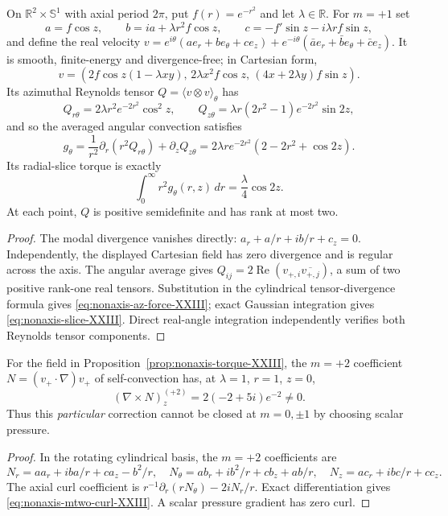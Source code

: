 \begin{proposition}
\label{prop:nonaxis-torque-XXIII}
On $\mathbb R^2\times\mathbb S^1$ with axial period $2\pi$,
put $f(r)=e^{-r^2}$ and let $\lambda\in\mathbb R$.
For $m=+1$ set
\[
a=f\cos z,\qquad b=ia+\lambda r^2f\cos z,\qquad
c=-f'\sin z-i\lambda rf\sin z,
\]
and define the real velocity
$v=e^{i\theta}(a e_r+b e_\theta+c e_z)
+e^{-i\theta}(\bar a e_r+\bar b e_\theta+\bar c e_z)$.
It is smooth, finite-energy and divergence-free; in Cartesian form,
\[
v=(2f\cos z(1-\lambda xy),\,2\lambda x^2f\cos z,\,
       (4x+2\lambda y)f\sin z).
\]
Its azimuthal Reynolds tensor $Q=\langle v\otimes v\rangle_\theta$
has
\[
Q_{r\theta}=2\lambda r^2e^{-2r^2}\cos^2z,\qquad
Q_{z\theta}=\lambda r(2r^2-1)e^{-2r^2}\sin2z,
\]
and so the averaged angular convection satisfies
\begin{equation}\label{eq:nonaxis-az-force-XXIII}
g_\theta=\frac1{r^2}\partial_r(r^2Q_{r\theta})
             +\partial_zQ_{z\theta}
=2\lambda r e^{-2r^2}(2-2r^2+\cos2z).
\end{equation}
Its radial-slice torque is exactly
\begin{equation}\label{eq:nonaxis-slice-XXIII}
\int_0^\infty r^2g_\theta(r,z)\,dr
=\frac{\lambda}{4}\cos2z.
\end{equation}
At each point, $Q$ is positive semidefinite and has rank at most
two.
\end{proposition}
\begin{proof}
The modal divergence vanishes directly:
$a_r+a/r+ib/r+c_z=0$. Independently, the displayed Cartesian
field has zero divergence and is regular across the axis.
The angular average gives
$Q_{ij}=2\operatorname{Re}(v_{+,i}\overline{v_{+,j}})$,
a sum of two positive rank-one real tensors.
Substitution in the cylindrical tensor-divergence formula gives
\eqref{eq:nonaxis-az-force-XXIII}; exact Gaussian integration gives
\eqref{eq:nonaxis-slice-XXIII}. Direct real-angle integration
independently verifies both Reynolds tensor components.
\end{proof}

\begin{proposition}
\label{prop:nonaxis-mtwo-XXIII}
For the field in Proposition~\ref{prop:nonaxis-torque-XXIII}, the
$m=+2$ coefficient $N=(v_+\cdot\nabla)v_+$ of self-convection
has, at $\lambda=1$, $r=1$, $z=0$,
\begin{equation}\label{eq:nonaxis-mtwo-curl-XXIII}
(\nabla\times N)^{(+2)}_z=2(-2+5i)e^{-2}\ne0.
\end{equation}
Thus this \emph{particular} correction cannot be closed at
$m=0,\pm1$ by choosing scalar pressure.
\end{proposition}
\begin{proof}
In the rotating cylindrical basis, the $m=+2$ coefficients are
\[
N_r=aa_r+iba/r+ca_z-b^2/r,\quad
N_\theta=ab_r+ib^2/r+cb_z+ab/r,\quad
N_z=ac_r+ibc/r+cc_z.
\]
The axial curl coefficient is
$r^{-1}\partial_r(rN_\theta)-2iN_r/r$.
Exact differentiation gives \eqref{eq:nonaxis-mtwo-curl-XXIII}.
A scalar pressure gradient has zero curl.
\end{proof}

